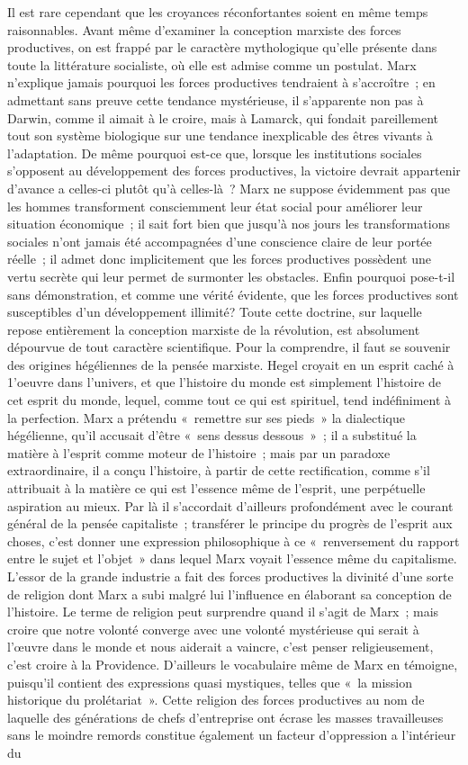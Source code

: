 \documentclass[french,twoside]{book} %
\begin{document}
Il est rare cependant que les croyances réconfortantes soient en même temps raisonnables. Avant même d'examiner la conception marxiste des forces productives, on est frappé par le caractère mythologique qu'elle présente dans toute la littérature socialiste, où elle est admise comme un postulat. Marx n'explique jamais pourquoi les forces productives tendraient à s'accroître ; en admettant sans preuve cette tendance mystérieuse, il s'apparente non pas à Darwin, comme il aimait à le croire, mais à Lamarck, qui fondait pareillement tout son système biologique sur une tendance inexplicable des êtres vivants à l'adaptation. De même pourquoi est-ce que, lorsque les institutions sociales s'opposent au développement des forces productives, la victoire devrait appartenir d'avance a celles-ci plutôt qu'à celles-là ? Marx ne suppose évidemment pas que les hommes transforment consciemment leur état social pour améliorer leur situation économique ; il sait fort bien que jusqu'à nos jours les transformations sociales n'ont jamais été accompagnées d'une conscience claire de leur portée réelle ; il admet donc implicitement que les forces productives possèdent une vertu secrète qui leur permet de surmonter les obstacles. Enfin pourquoi pose-t-il sans démonstration, et comme une vérité évidente, que les forces productives sont susceptibles d'un développement illimité? Toute cette doctrine, sur laquelle repose entièrement la conception marxiste de la révolution, est absolument dépourvue de tout caractère scientifique. Pour la comprendre, il faut se souvenir des origines hégéliennes de la pensée marxiste. Hegel croyait en un esprit caché à 1'oeuvre dans l'univers, et que l'histoire du monde est simplement l'histoire de cet esprit du monde, lequel, comme tout ce qui est spirituel, tend indéfiniment à la perfection. Marx a prétendu « remettre sur ses pieds » la dialectique hégélienne, qu'il accusait d'être « sens dessus dessous » ; il a substitué la matière à l'esprit comme moteur de l'histoire ; mais par un paradoxe extraordinaire, il a conçu l'histoire, à partir de cette rectification, comme s'il attribuait à la matière ce qui est l'essence même de l'esprit, une perpétuelle aspiration au mieux. Par là il s'accordait d'ailleurs profondément avec le courant général de la pensée capitaliste ; transférer le principe du progrès de l'esprit aux choses, c'est donner une expression philosophique à ce « renversement du rapport entre le sujet et l'objet » dans lequel Marx voyait l'essence même du capitalisme. L'essor de la grande industrie a fait des forces productives la divinité d'une sorte de religion dont Marx a subi malgré lui l'influence en élaborant sa conception de l'histoire. Le terme de religion peut surprendre quand il s'agit de Marx ; mais croire que notre volonté converge avec une volonté mystérieuse qui serait à l'œuvre dans le monde et nous aiderait a vaincre, c'est penser religieusement, c'est croire à la Providence. D'ailleurs le vocabulaire même de Marx en témoigne, puisqu'il contient des expressions quasi mystiques, telles que « la mission historique du prolétariat ». Cette religion des forces productives au nom de laquelle des générations de chefs d'entreprise ont écrase les masses travailleuses sans le moindre remords constitue également un facteur d'oppression a l'intérieur du 
\end{document}
